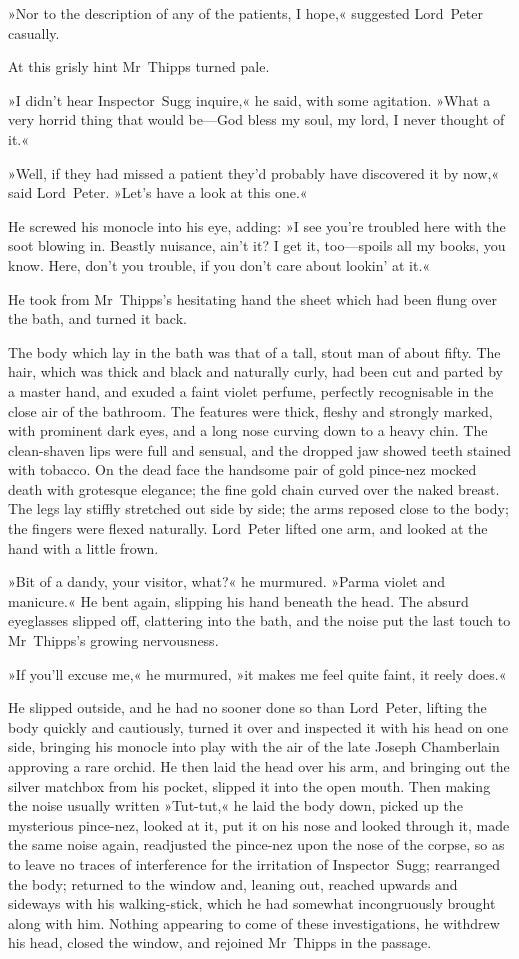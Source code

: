 »Nor to the description of any of the patients, I hope,« suggested Lord~Peter casually.

At this grisly hint Mr~Thipps turned pale.

»I didn't hear Inspector~Sugg inquire,« he said, with some agitation. »What a very horrid thing that would be—God bless my soul, my lord, I never thought of it.«

»Well, if they had missed a patient they'd probably have discovered it by now,« said Lord~Peter. »Let's have a look at this one.«

He screwed his monocle into his eye, adding: »I see you're troubled here with the soot blowing in. Beastly nuisance, ain't it? I get it, too—spoils all my books, you know. Here, don't you trouble, if you don't care about lookin' at it.«

He took from Mr~Thipps's hesitating hand the sheet which had been flung over the bath, and turned it back.

The body which lay in the bath was that of a tall, stout man of about fifty. The hair, which was thick and black and naturally curly, had been cut and parted by a master hand, and exuded a faint violet perfume, perfectly recognisable in the close air of the bathroom. The features were thick, fleshy and strongly marked, with prominent dark eyes, and a long nose curving down to a heavy chin. The clean-shaven lips were full and sensual, and the dropped jaw showed teeth stained with tobacco. On the dead face the handsome pair of gold pince-nez mocked death with grotesque elegance; the fine gold chain curved over the naked breast. The legs lay stiffly stretched out side by side; the arms reposed close to the body; the fingers were flexed naturally. Lord~Peter lifted one arm, and looked at the hand with a little frown.

»Bit of a dandy, your visitor, what?« he murmured. »Parma violet and manicure.« He bent again, slipping his hand beneath the head. The absurd eyeglasses slipped off, clattering into the bath, and the noise put the last touch to Mr~Thipps's growing nervousness.

»If you'll excuse me,« he murmured, »it makes me feel quite faint, it reely does.«

He slipped outside, and he had no sooner done so than Lord~Peter, lifting the body quickly and cautiously, turned it over and inspected it with his head on one side, bringing his monocle into play with the air of the late Joseph Chamberlain approving a rare orchid. He then laid the head over his arm, and bringing out the silver matchbox from his pocket, slipped it into the open mouth. Then making the noise usually written »Tut-tut,« he laid the body down, picked up the mysterious pince-nez, looked at it, put it on his nose and looked through it, made the same noise again, readjusted the pince-nez upon the nose of the corpse, so as to leave no traces of interference for the irritation of Inspector~Sugg; rearranged the body; returned to the window and, leaning out, reached upwards and sideways with his walking-stick, which he had somewhat incongruously brought along with him. Nothing appearing to come of these investigations, he withdrew his head, closed the window, and rejoined Mr~Thipps in the passage.

